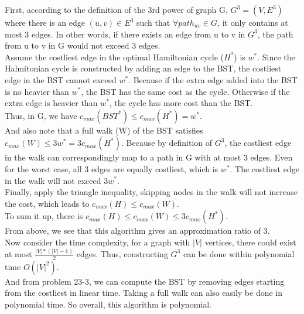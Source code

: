 \documentclass[titlepage, paper=a4, fontsize=11pt]{scrartcl} %
\numberwithin{equation}{section} %
\numberwithin{figure}{section} %
\numberwithin{table}{section} %
\begin{document}
First, according to the definition of the 3rd power of graph G, $G^3 = (V, E^3)$ where there is an edge
$(u, v) \in E^3$ such that $\forall path_{uv} \in G$, it only contains at most 3 edges. In other words, if there exists an edge from u to v in $G^3$, the path from u to v in G would not exceed 3 edges. \\
Assume the costliest edge in the optimal Hamiltonian cycle ($H^*$) is $w^*$. Since the Halmitonian cycle is constructed by adding an edge to the BST, the costliest edge in the BST cannot exceed $w^*$. Because if the extra edge added into the BST is no heavier than $w^*$, the BST has the same cost as the cycle. Otherwise if the extra edge is heavier than $w^*$, the cycle has more cost than the BST. \\
Thus, in G, we have $c_{max}(BST^*) \leq c_{max}(H^*) = w^*$. \\
And also note that a full walk (W) of the BST satisfies $c_{max}(W) \leq 3w^* = 3c_{max}(H^*)$. Because by definition of $G^3$, the costliest edge in the walk can correspondingly map to a path in G with at most 3 edges. Even for the worst case, all 3 edges are equally costliest, which is $w^*$. The costliest edge in the walk will not exceed $3w^*$. \\
Finally, apply the triangle inequality, skipping nodes in the walk will not increase the cost, which leads to
$c_{max}(H) \leq c_{max}(W)$. \\
To sum it up, there is $c_{max}(H) \leq c_{max}(W) \leq 3c_{max}(H^*)$. \\
From above, we see that this algorithm gives an approximation ratio of 3. \\

Now consider the time complexity, for a graph with $|V|$ vertices, there could exist at most $\frac{|V|*(|V|-1)}{2}$ edges. Thus, constructing $G^3$ can be done within polynomial time $O(|V|^2)$. \\
And from problem 23-3, we can compute the BST by removing edges starting from the costliest in linear time. Taking a full walk can also easily be done in polynomial time. So overall, this algorithm is polynomial. \\
\end{document}
